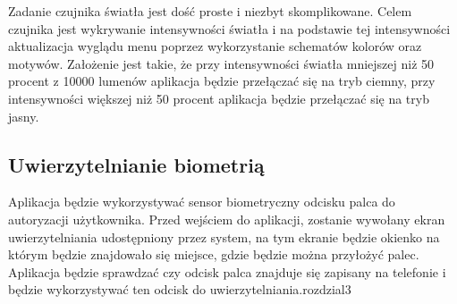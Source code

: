 Zadanie czujnika światła jest dość proste i niezbyt skomplikowane.
Celem czujnika jest wykrywanie intensywności światła i na podstawie tej intensywności aktualizacja wyglądu menu poprzez wykorzystanie schematów kolorów oraz motywów. Założenie jest takie, że przy intensywności światła mniejszej niż 50 procent z 10000 lumenów aplikacja będzie przełączać się na tryb ciemny, przy intensywności większej niż 50 procent aplikacja będzie przełączać się na tryb jasny.

\subsection{Uwierzytelnianie biometrią}
Aplikacja będzie wykorzystywać sensor biometryczny odcisku palca do autoryzacji użytkownika. Przed wejściem do aplikacji, zostanie wywołany ekran uwierzytelniania udostępniony przez system, na tym ekranie będzie okienko na którym będzie znajdowało się miejsce, gdzie będzie można przyłożyć palec. Aplikacja będzie sprawdzać czy odcisk palca znajduje się zapisany na telefonie i będzie wykorzystywać ten odcisk do uwierzytelniania.rozdzial3
